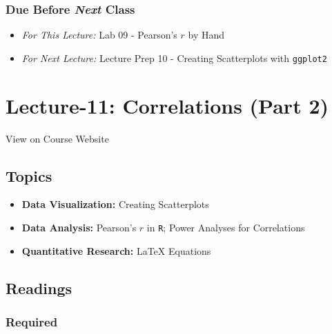 \documentclass[]{book}
\providecommand{\tightlist}{%
  \setlength{\itemsep}{0pt}\setlength{\parskip}{0pt}}
\theoremstyle{definition}
\theoremstyle{definition}
\theoremstyle{definition}
\theoremstyle{remark}
\begin{document}
\hypertarget{due-before-next-class-9}{%
\subsubsection*{\texorpdfstring{Due Before \emph{Next}
Class}{Due Before Next Class}}\label{due-before-next-class-9}}

\begin{itemize}
\tightlist
\item
  \emph{For This Lecture:} Lab 09 - Pearson's \(r\) by Hand
\item
  \emph{For Next Lecture:} Lecture Prep 10 - Creating Scatterplots with
  \texttt{ggplot2}
\end{itemize}

\hypertarget{lecture-11-correlations-part-2}{%
\section*{Lecture-11: Correlations (Part
2)}\label{lecture-11-correlations-part-2}}

View on Course Website

\hypertarget{topics-11}{%
\subsection*{Topics}\label{topics-11}}

\begin{itemize}
\tightlist
\item
  \textbf{Data Visualization:} Creating Scatterplots
\item
  \textbf{Data Analysis:} Pearson's \(r\) in \texttt{R}; Power Analyses
  for Correlations
\item
  \textbf{Quantitative Research:} LaTeX Equations
\end{itemize}

\hypertarget{readings-12}{%
\subsection*{Readings}\label{readings-12}}

\hypertarget{required-12}{%
\subsubsection*{Required}\label{required-12}}
\end{document}
